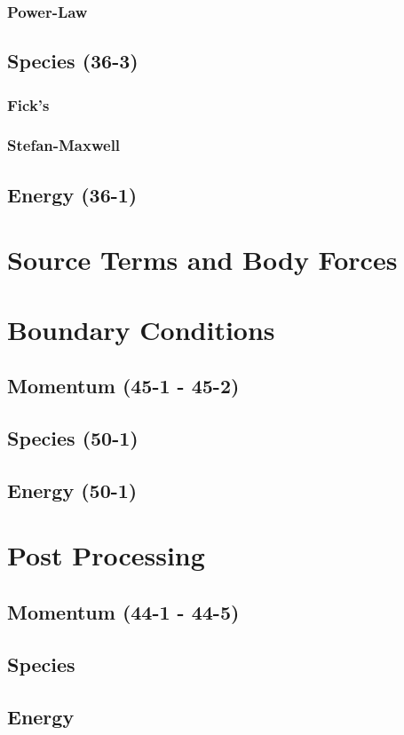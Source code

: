 \documentclass{mitqualif}
\begin{document}
\subsubsection{Power-Law}
\subsection{Species (36-3)}
\subsubsection{Fick's}
\subsubsection{Stefan-Maxwell}
\subsection{Energy (36-1)}
%
\section{Source Terms and Body Forces}
\section{Boundary Conditions}
\subsection{Momentum (45-1 - 45-2)}
\subsection{Species (50-1)}
\subsection{Energy (50-1)}
\section{Post Processing}
\subsection{Momentum (44-1 - 44-5)}
\subsection{Species}
\subsection{Energy}
\end{document}

